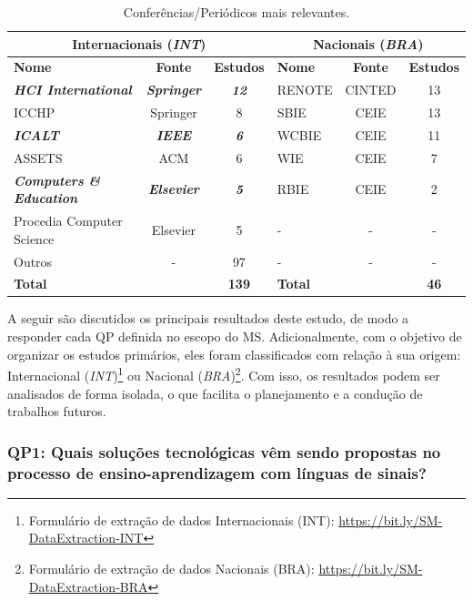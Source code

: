 \begin{table}[htb]
\caption{Conferências/Periódicos mais relevantes.}
\label{results:table:publication-venues}
\centering
\begin{tabular}{lcc|lcc} \hline
\multicolumn{3}{c|}{\textbf{Internacionais (\textit{INT})}} & \multicolumn{3}{c}{\textbf{Nacionais (\textit{BRA})}} \\ \hline
\textbf{Nome} & \textbf{Fonte} & \textbf{Estudos} & \textbf{Nome} & \textbf{Fonte} & \textbf{Estudos} \\ \hline
\textit{\textbf{HCI International}} & \textit{\textbf{Springer}} & \textit{\textbf{12}} & RENOTE & CINTED & 13 \\ 
ICCHP & Springer & 8 & SBIE & CEIE & 13 \\ 
\textit{\textbf{ICALT}} & \textit{\textbf{IEEE}} & \textit{\textbf{6}} & WCBIE & CEIE & 11 \\ 
ASSETS & ACM & 6 & WIE & CEIE & 7 \\ 
\textit{\textbf{Computers \& Education}} & \textit{\textbf{Elsevier}} & \textit{\textbf{5}} & RBIE & CEIE & 2 \\ 
Procedia Computer Science & Elsevier & 5 & - & - & - \\ 
Outros & - & 97 & - & - & - \\ \hline
\multicolumn{2}{l}{\textbf{Total}} & \textbf{139} & \multicolumn{2}{l}{\textbf{Total}} & \textbf{46} \\ \hline
\end{tabular}
\end{table}

A seguir são discutidos os principais resultados deste estudo, de modo a responder cada QP definida no escopo do MS. Adicionalmente, com o objetivo de organizar os estudos primários, eles foram classificados com relação à sua origem: Internacional (\textit{INT})\footnote{Formulário de extração de dados Internacionais (INT): \url{https://bit.ly/SM-DataExtraction-INT}} ou Nacional (\textit{BRA})\footnote{Formulário de extração de dados Nacionais (BRA): \url{https://bit.ly/SM-DataExtraction-BRA}}. Com isso, os resultados podem ser analisados de forma isolada, o que facilita o planejamento e a condução de trabalhos futuros.

\subsubsection{QP1: Quais soluções tecnológicas vêm sendo propostas no processo de ensino-aprendizagem com línguas de sinais?}

